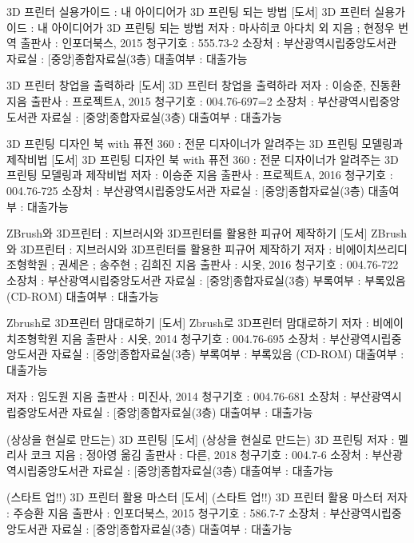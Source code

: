 \documentclass[12pt, a4paper, oneside]{book}
\begin{document}
		\clearpage



 3D 프린터 실용가이드  : 내 아이디어가 3D 프린팅 되는 방법
[도서]	3D 프린터 실용가이드 : 내 아이디어가 3D 프린팅 되는 방법
저자 : 마사히코 아다치 외 지음 ; 현정우 번역 
출판사 : 인포더북스, 2015 
청구기호 : 555.73-2 
소장처 : 부산광역시립중앙도서관 
자료실 : [중앙]종합자료실(3층) 
대출여부 : 대출가능

3D 프린터 창업을 출력하라
[도서]	3D 프린터 창업을 출력하라
저자 : 이승준, 진동환 지음 
출판사 : 프로젝트A, 2015 
청구기호 : 004.76-697=2 
소장처 : 부산광역시립중앙도서관 
자료실 : [중앙]종합자료실(3층) 
대출여부 : 대출가능



3D 프린팅 디자인 북 with 퓨전 360 : 전문 디자이너가 알려주는 3D 프린팅 모델링과 제작비법
[도서]	3D 프린팅 디자인 북 with 퓨전 360 : 전문 디자이너가 알려주는 3D 프린팅 모델링과 제작비법
저자 : 이승준 지음 
출판사 : 프로젝트A, 2016 
청구기호 : 004.76-725 
소장처 : 부산광역시립중앙도서관 
자료실 : [중앙]종합자료실(3층) 
대출여부 : 대출가능

ZBrush와 3D프린터 : 지브러시와 3D프린터를 활용한 피규어 제작하기
[도서]	ZBrush와 3D프린터 : 지브러시와 3D프린터를 활용한 피규어 제작하기
저자 : 비에이치쓰리디조형학원 ; 권세은 ; 송주현 ; 김희진 지음 
출판사 : 시옷, 2016 
청구기호 : 004.76-722 
소장처 : 부산광역시립중앙도서관 
자료실 : [중앙]종합자료실(3층) 
부록여부 : 부록있음 (CD-ROM) 
대출여부 : 대출가능

Zbrush로 3D프린터 맘대로하기
[도서]	Zbrush로 3D프린터 맘대로하기
저자 : 비에이치조형학원 지음 
출판사 : 시옷, 2014 
청구기호 : 004.76-695 
소장처 : 부산광역시립중앙도서관 
자료실 : [중앙]종합자료실(3층) 
부록여부 : 부록있음 (CD-ROM) 
대출여부 : 대출가능

저자 : 임도원 지음 
출판사 : 미진사, 2014 
청구기호 : 004.76-681 
소장처 : 부산광역시립중앙도서관 
자료실 : [중앙]종합자료실(3층) 
대출여부 : 대출가능


(상상을 현실로 만드는) 3D 프린팅
[도서]	(상상을 현실로 만드는) 3D 프린팅
저자 : 멜리사 코크 지음 ; 정아영 옮김 
출판사 : 다른, 2018 
청구기호 : 004.7-6 
소장처 : 부산광역시립중앙도서관 
자료실 : [중앙]종합자료실(3층) 
대출여부 : 대출가능

(스타트 업!!) 3D 프린터 활용 마스터
[도서]	(스타트 업!!) 3D 프린터 활용 마스터
저자 : 주승환 지음 
출판사 : 인포더북스, 2015 
청구기호 : 586.7-7 
소장처 : 부산광역시립중앙도서관 
자료실 : [중앙]종합자료실(3층) 
대출여부 : 대출가능
\end{document}

